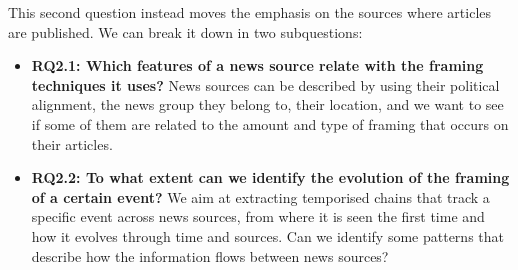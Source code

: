 \vspace{12px}

This second question instead moves the emphasis on the sources where articles are published. We can break it down in two subquestions:

\begin{itemize}
    \item \textbf{RQ2.1: Which features of a news source relate with the framing techniques it uses?}
    News sources can be described by using their political alignment, the news group they belong to, their location, and we want to see if some of them are related to the amount and type of framing that occurs on their articles.
    
    \item \textbf{RQ2.2: To what extent can we identify the evolution of the framing of a certain event?}
    We aim at extracting temporised chains that track a specific event across news sources, from where it is seen the first time and how it evolves through time and sources.
    Can we identify some patterns that describe how the information flows between news sources?
    
    
    
\end{itemize}
